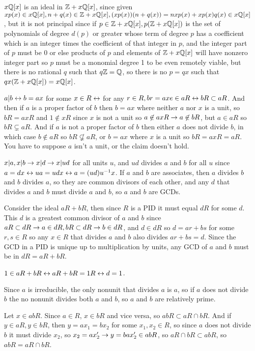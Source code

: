 \documentclass[11pt, oneside]{article}   	%
\begin{document}
\item $x\mathbb{Q}[x]$ is an ideal in $\mathbb{Z} + x\mathbb{Q}[x]$, since given $xp(x) \in x\mathbb{Q}[x], n + q(x) \in \mathbb{Z} + x\mathbb{Q}[x], (xp(x))(n + q(x)) = nxp(x) + xp(x)q(x) \in x\mathbb{Q}[x]$, but it is not principal since if $p \in \mathbb{Z} + x\mathbb{Q}[x], p(\mathbb{Z} + x\mathbb{Q}[x])$ is the set of polynomials of degree $d(p)$ or greater whose term of degree $p$ has a coefficient which is an integer times the coefficient of that integer in $p$, and the integer part of $p$ must be 0 or else products of $p$ and elements of $\mathbb{Z} + x\mathbb{Q}[x]$ will have nonzero integer part so $p$ must be a monomial degree 1 to be even remotely viable, but there is no rational $q$ such that $q\mathbb{Z} = \mathbb{Q}$, so there is no $p=qx$ such that $qx(\mathbb{Z} + x\mathbb{Q}[x]) = x\mathbb{Q}[x]$.
\item $a | b \leftrightarrow b=ax $ for some $x \in R \leftrightarrow$ for any $r \in R, br = axe \in aR \leftrightarrow bR \subset aR$. And then if $a$ is a proper factor of $b$ then $b = ax$ where neither $a$ nor $x$ is a unit, so $bR = axR$ and $1 \not \in xR$ since $x$ is not a unit so $a \not \in axR \rightarrow a \not \in bR$, but $a \in aR$ so $bR \subsetneq aR$. And if $a$ is not a proper factor of $b$ then either $a$ does not divide $b$, in which case $b \not \in aR$ so $bR \not \subsetneq aR$, or $b = ax$ where $x$ is a unit so $bR = axR = aR$. You have to suppose $a$ isn't a unit, or the claim doesn't hold.
\item $x |a, x|b \rightarrow x |d \rightarrow x |ud$ for all units $u$, and $ud$ divides $a$ and $b$ for all $u$ since $a=dx \leftrightarrow ua = udx \leftrightarrow a = (ud)u^{-1} x$. If $a$ and $b$ are associates, then $a$ divides $b$ and $b$ divides $a$, so they are common divisors of each other, and any $d$ that divides $a$ and $b$ must divide $a$ and $b$, so $a$ and $b$ are GCDs.
\item Consider the ideal $aR + bR$, then since $R$ is a PID it must equal $dR$ for some $d$. This $d$ is a greatest common divisor of $a$ and $b$ since $aR \subset dR \rightarrow a \in dR, bR \subset dR \rightarrow b \in dR$, and $d \in dR$ so $d = ar + bs$ for some $r, s \in R$ so any $x \in R$ that divides $a$ and $b$ also divides $ar + bs = d$. Since the GCD in a PID is unique up to multiplication by units, any GCD of $a$ and $b$ must be in $dR = aR + bR$.

$1 \in aR + bR \leftrightarrow aR + bR = 1R \leftrightarrow d=1$. 
\item Since $a$ is irreducible, the only nonunit that divides $a$ is $a$, so if $a$ does not divide $b$ the no nonunit divides both $a$ and $b$, so $a$ and $b$ are relatively prime.
\item Let $x \in abR$. Since $a \in R$, $x \in bR$ and vice versa, so $abR \subset aR \cap bR$. And if $y \in aR, y \in bR$, then $y = ax_1 = bx_2$ for some $x_1, x_2 \in R$, so since $a$ does not divide $b$ it must divide $x_2$, so $x_2 = ax_2' \rightarrow y = bax_2' \in abR$, so $aR \cap bR \subset abR$, so $abR = aR \cap bR$. 
\end{document}

